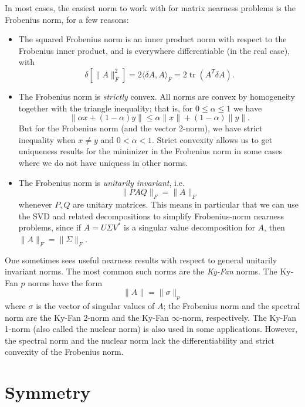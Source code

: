 \documentclass[12pt, leqno]{article} %
\begin{document}
In most cases, the easiest norm to work with for matrix nearness
problems is the Frobenius norm, for a few reasons:
\begin{itemize}
\item The squared Frobenius norm is an inner product norm with respect
  to the Frobenius inner product, and is everywhere differentiable (in
  the real case), with
  \[
    \delta \left[ \|A\|_F^2 \right] =
    2 \langle \delta A, A \rangle_F =
    2 \operatorname{tr}(A^T \delta A).
  \]
\item The Frobenius norm is {\em strictly} convex.  All norms
  are convex by homogeneity together with the triangle inequality;
  that is, for $0 \leq \alpha \leq 1$ we have
  \[
    \|\alpha x + (1-\alpha) y\| \leq \alpha \|x\| + (1-\alpha) \|y\|.
  \]
  But for the Frobenius norm (and the vector 2-norm), we have strict
  inequality when $x \neq y$ and $0 < \alpha < 1$.  Strict convexity
  allows us to get uniqueness results for the minimizer in the
  Frobenius norm in some cases where we do not have uniquess in other
  norms.
\item The Frobenius norm is {\em unitarily invariant}, i.e.
  \[
    \|PAQ\|_F = \|A\|_F
  \]
  whenever $P, Q$ are unitary matrices.  This means in particular that
  we can use the SVD and related decompositions to simplify
  Frobenius-norm nearness problems, since if $A = U \Sigma V^*$ is a
  singular value decomposition for $A$, then $\|A\|_F = \|\Sigma\|_F$.
\end{itemize}

One sometimes sees useful nearness results with respect to general
unitarily invariant norms.  The most common such norms are the
{\em Ky-Fan} norms.  The Ky-Fan $p$ norms have the form
\[
  \|A\| = \|\sigma\|_p
\]
where $\sigma$ is the vector of singular values of $A$; the Frobenius
norm and the spectral norm are the Ky-Fan 2-norm and the Ky-Fan
$\infty$-norm, respectively.  The Ky-Fan 1-norm (also called the
nuclear norm) is also used in some applications.  However, the
spectral norm and the nuclear norm lack the differentiability and
strict convexity of the Frobenius norm.

\section{Symmetry}
\end{document}
